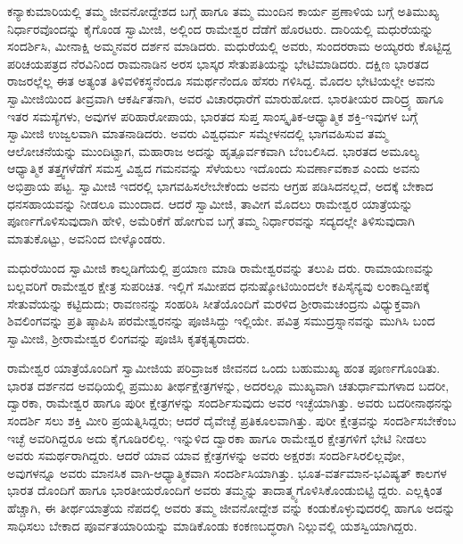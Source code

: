 ಕನ್ಯಾಕುಮಾರಿಯಲ್ಲಿ ತಮ್ಮ ಜೀವನೋದ್ದೇಶದ ಬಗ್ಗೆ ಹಾಗೂ ತಮ್ಮ ಮುಂದಿನ ಕಾರ್ಯ ಪ್ರಣಾಳಿಯ ಬಗ್ಗೆ ಅತಿಮುಖ್ಯ ನಿರ್ಧಾರವೊಂದನ್ನು ಕೈಗೊಂಡ ಸ್ವಾಮೀಜಿ, ಅಲ್ಲಿಂದ ರಾಮೇಶ್ವರ ದೆಡೆಗೆ ಹೊರಟರು. ದಾರಿಯಲ್ಲಿ ಮಧುರೆಯನ್ನು ಸಂದರ್ಶಿಸಿ, ಮೀನಾಕ್ಷಿ ಅಮ್ಮನವರ ದರ್ಶನ ಮಾಡಿದರು. ಮಧುರೆಯಲ್ಲಿ ಅವರು, ಸುಂದರರಾಮ ಅಯ್ಯರರು ಕೊಟ್ಟಿದ್ದ ಪರಿಚಯಪತ್ರದ ನೆರವಿನಿಂದ ರಾಮನಾಡಿನ ಅರಸ ಭಾಸ್ಕರ ಸೇತುಪತಿಯನ್ನು ಭೇಟಿಮಾಡಿದರು. ದಕ್ಷಿಣ ಭಾರತದ ರಾಜರಲ್ಲೆಲ್ಲ ಈತ ಅತ್ಯಂತ ತಿಳಿವಳಿಕಸ್ಥನೆಂದೂ ಸಮರ್ಥನೆಂದೂ ಹೆಸರು ಗಳಿಸಿದ್ದ. ಮೊದಲ ಭೇಟಿಯಲ್ಲೇ ಅವನು ಸ್ವಾಮೀಜಿಯಿಂದ ತೀವ್ರವಾಗಿ ಆಕರ್ಷಿತನಾಗಿ, ಅವರ ವಿಚಾರಧಾರೆಗೆ ಮಾರುಹೋದ. ಭಾರತೀಯರ ದಾರಿದ್ರ್ಯ ಹಾಗೂ ಇತರ ಸಮಸ್ಯೆಗಳು, ಅವುಗಳ ಪರಿಹಾರೋಪಾಯ, ಭಾರತದ ಸುಪ್ತ ಸಾಂಸ್ಕೃತಿಕ-ಆಧ್ಯಾತ್ಮಿಕ ಶಕ್ತಿ-ಇವುಗಳ ಬಗ್ಗೆ ಸ್ವಾಮೀಜಿ ಉಜ್ವಲವಾಗಿ ಮಾತನಾಡಿದರು. ಅವರು ವಿಶ್ವಧರ್ಮ ಸಮ್ಮೇಳನದಲ್ಲಿ ಭಾಗವಹಿಸುವ ತಮ್ಮ ಆಲೋಚನೆಯನ್ನು ಮುಂದಿಟ್ಟಾಗ, ಮಹಾರಾಜ ಅದನ್ನು ಹೃತ್ಪೂರ್ವಕವಾಗಿ ಬೆಂಬಲಿಸಿದ. ಭಾರತದ ಅಮೂಲ್ಯ ಆಧ್ಯಾತ್ಮಿಕ ತತ್ತ್ವಗಳೆಡೆಗೆ ಸಮಸ್ತ ವಿಶ್ವದ ಗಮನವನ್ನು ಸೆಳೆಯಲು ಇದೊಂದು ಸುವರ್ಣಾವಕಾಶ ಎಂದು ಅವನು ಅಭಿಪ್ರಾಯ ಪಟ್ಟ. ಸ್ವಾಮೀಜಿ ಇದರಲ್ಲಿ ಭಾಗವಹಿಸಲೇಬೇಕೆಂದು ಅವನು ಆಗ್ರಹ ಪಡಿಸಿದನಲ್ಲದೆ, ಅದಕ್ಕೆ ಬೇಕಾದ ಧನಸಹಾಯವನ್ನು ನೀಡಲೂ ಮುಂದಾದ. ಆದರೆ ಸ್ವಾಮೀಜಿ, ತಾವೀಗ ಮೊದಲು ರಾಮೇಶ್ವರ ಯಾತ್ರೆಯನ್ನು ಪೂರ್ಣಗೊಳಿಸುವುದಾಗಿ ಹೇಳಿ, ಅಮೆರಿಕೆಗೆ ಹೋಗುವ ಬಗ್ಗೆ ತಮ್ಮ ನಿರ್ಧಾರವನ್ನು ಸದ್ಯದಲ್ಲೇ ತಿಳಿಸುವುದಾಗಿ ಮಾತುಕೊಟ್ಟು, ಅವನಿಂದ ಬೀಳ್ಕೊಂಡರು.

ಮಧುರೆಯಿಂದ ಸ್ವಾಮೀಜಿ ಕಾಲ್ನಡಿಗೆಯಲ್ಲಿ ಪ್ರಯಾಣ ಮಾಡಿ ರಾಮೇಶ್ವರವನ್ನು ತಲುಪಿ ದರು. ರಾಮಾಯಣವನ್ನು ಬಲ್ಲವರಿಗೆ ರಾಮೇಶ್ವರ ಕ್ಷೇತ್ರ ಸುಪರಿಚಿತ. ಇಲ್ಲಿಗೆ ಸಮೀಪದ ಧನುಷ್ಕೋಟಿಯಿಂದಲೇ ಕಪಿಸೈನ್ಯವು ಲಂಕಾದ್ವೀಪಕ್ಕೆ ಸೇತುವೆಯನ್ನು ಕಟ್ಟಿದುದು; ರಾವಣನನ್ನು ಸಂಹರಿಸಿ ಸೀತೆಯೊಂದಿಗೆ ಮರಳಿದ ಶ್ರೀರಾಮಚಂದ್ರನು ವಿಧ್ಯುಕ್ತವಾಗಿ ಶಿವಲಿಂಗವನ್ನು ಪ್ರತಿ ಷ್ಠಾಪಿಸಿ ಪರಮೇಶ್ವರನನ್ನು ಪೂಜಿಸಿದ್ದು ಇಲ್ಲಿಯೇ. ಪವಿತ್ರ ಸಮುದ್ರಸ್ನಾನವನ್ನು ಮುಗಿಸಿ ಬಂದ ಸ್ವಾಮೀಜಿ, ಶ್ರೀರಾಮೇಶ್ವರ ಲಿಂಗವನ್ನು ಪೂಜಿಸಿ ಕೃತಕೃತ್ಯರಾದರು.

ರಾಮೇಶ್ವರ ಯಾತ್ರೆಯೊಂದಿಗೆ ಸ್ವಾಮೀಜಿಯ ಪರಿವ್ರಾಜಕ ಜೀವನದ ಒಂದು ಬಹುಮುಖ್ಯ ಹಂತ ಪೂರ್ಣಗೊಂಡಿತು. ಭಾರತ ದರ್ಶನದ ಅವಧಿಯಲ್ಲಿ ಪ್ರಮುಖ ತೀರ್ಥಕ್ಷೇತ್ರಗಳನ್ನು, ಅದರಲ್ಲೂ ಮುಖ್ಯವಾಗಿ ಚತುರ್ಧಾಮಗಳಾದ ಬದರೀ, ದ್ವಾರಕಾ, ರಾಮೇಶ್ವರ ಹಾಗೂ ಪುರೀ ಕ್ಷೇತ್ರಗಳನ್ನು ಸಂದರ್ಶಿಸುವುದು ಅವರ ಇಚ್ಛೆಯಾಗಿತ್ತು. ಅವರು ಬದರೀನಾಥನನ್ನು ಸಂದರ್ಶಿ ಸಲು ಶಕ್ತಿ ಮೀರಿ ಪ್ರಯತ್ನಿಸಿದ್ದರು; ಆದರೆ ದೈವೇಚ್ಛೆ ಪ್ರತಿಕೂಲವಾಗಿತ್ತು. ಪುರೀ ಕ್ಷೇತ್ರವನ್ನು ಸಂದರ್ಶಿಸಬೇಕೆಂಬ ಇಚ್ಛೆ ಅವರಿಗಿದ್ದರೂ ಅದು ಕೈಗೂಡಿರಲಿಲ್ಲ. ಇನ್ನುಳಿದ ದ್ವಾರಕಾ ಹಾಗೂ ರಾಮೇಶ್ವರ ಕ್ಷೇತ್ರಗಳಿಗೆ ಭೇಟಿ ನೀಡಲು ಅವರು ಸಮರ್ಥರಾಗಿದ್ದರು. ಆದರೆ ಯಾವ ಯಾವ ಕ್ಷೇತ್ರಗಳನ್ನು ಅವರು ಅಕ್ಷರಶಃ ಸಂದರ್ಶಿಸಿರಲಿಲ್ಲವೋ, ಅವುಗಳನ್ನೂ ಅವರು ಮಾನಸಿಕ ವಾಗಿ-ಆಧ್ಯಾತ್ಮಿಕವಾಗಿ ಸಂದರ್ಶಿಸಿಯಾಗಿತ್ತು. ಭೂತ-ವರ್ತಮಾನ-ಭವಿಷ್ಯತ್ ಕಾಲಗಳ ಭಾರತ ದೊಂದಿಗೆ ಹಾಗೂ ಭಾರತೀಯರೊಂದಿಗೆ ಅವರು ತಮ್ಮನ್ನು ತಾದಾತ್ಮ್ಯಗೊಳಿಸಿಕೊಂಡುಬಿಟ್ಟಿ ದ್ದರು. ಎಲ್ಲಕ್ಕಿಂತ ಹೆಚ್ಚಾಗಿ, ಈ ತೀರ್ಥಯಾತ್ರೆಯ ನೆಪದಲ್ಲಿ ಅವರು ತಮ್ಮ ಜೀವನೋದ್ದೇಶ ವನ್ನು ಕಂಡುಕೊಳ್ಳುವುದರಲ್ಲಿ ಹಾಗೂ ಅದನ್ನು ಸಾಧಿಸಲು ಬೇಕಾದ ಪೂರ್ವತಯಾರಿಯನ್ನು ಮಾಡಿಕೊಂಡು ಕಂಕಣಬದ್ಧರಾಗಿ ನಿಲ್ಲುವಲ್ಲಿ ಯಶಸ್ವಿಯಾಗಿದ್ದರು.

